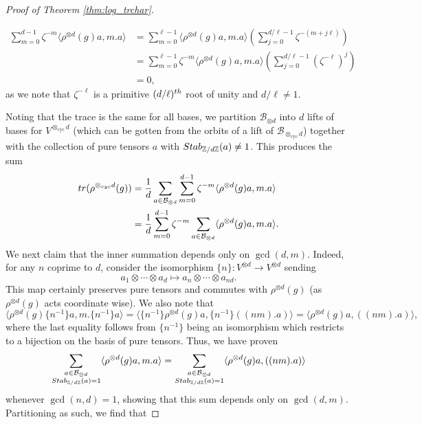 \documentclass[10pt,a4paper]{amsart}
\newcommand{\Stab}{\textnormal{Stab}}
\newcommand{\Z}{\mathbb{Z}}
\begin{document}
\begin{proof}[Proof of Theorem \ref{thm:log_trchar}]
\begin{enumerate}
{    \begin{align*}
    \sum_{m=0}^{d-1} \zeta^{-m}\langle \rho^{\otimes d}(g)a,m.a\rangle &= \sum_{m=0}^{\ell-1}\langle \rho^{\otimes d}(g)a,m.a\rangle \left(\sum_{j=0}^{d/\ell - 1} \zeta^{-(m+j\ell)}\right)\\
    &=\sum_{m=0}^{\ell-1}\zeta^{-m}\langle \rho^{\otimes d}(g)a,m.a\rangle \left(\sum_{j=0}^{d/\ell - 1} (\zeta^{-\ell})^j\right)\\
    &= 0,
    \end{align*}
    as we note that $\zeta^{-\ell}$ is a primitive $(d/\ell)^{\rm th}$ root of unity and $d/\ell\ne 1$.}
\end{enumerate}

Noting that the trace is the same for all bases, we partition $\mathcal{B}_{\otimes d}$ into $d$ lifts of bases for $V^{\otimes_{\text{cyc}} d}$ (which can be gotten from the orbits of a lift of $\mathcal{B}_{\otimes_{\text{cyc}}d}$) together with the collection of pure tensors $a$ with $\Stab_{\Z/d\Z}(a)\ne 1$. This produces the sum
\begin{align*}
{\rm tr}(\rho^{\otimes_{\rm cyc} d}(g))&=\frac{1}{d}\sum_{a\in\mathcal{B}_{\otimes d}}\sum_{m=0}^{d-1} \zeta^{-m} \langle\rho^{\otimes d}(g)a,m.a\rangle\\
&=\frac{1}{d}\sum_{m=0}^{d-1}\zeta^{-m} \sum_{a\in\mathcal{B}_{\otimes d}} \langle\rho^{\otimes d}(g)a,m.a\rangle.
\end{align*}
We next claim that the inner summation depends only on $\gcd(d,m)$. Indeed, for any $n$ coprime to $d$, consider the isomorphism $\{n\}:V^{\otimes d} \to V^{\otimes d}$ sending
\[
a_1\otimes \cdots \otimes a_d\mapsto a_n\otimes \cdots \otimes a_{nd}.
\]
This map certainly preserves pure tensors and commutes with $\rho^{\otimes d}(g)$ (as $\rho^{\otimes d}(g)$ acts coordinate wise). We also note that
\[
\langle \rho^{\otimes d}(g)\{n^{-1}\}a,m.\{n^{-1}\}a\rangle = \langle\{n^{-1}\} \rho^{\otimes d}(g)a,\{n^{-1}\}((nm).a)\rangle = \langle\rho^{\otimes d}(g)a,((nm).a)\rangle,
\]
where the last equality follows from $\{n^{-1}\}$ being an isomorphism which restricts to a bijection on the basis of pure tensors. Thus, we have proven
\[
\sum_{\substack{a\in\mathcal{B}_{\otimes d}\\\Stab_{\Z/d\Z}(a)=1}} \langle\rho^{\otimes d}(g)a,m.a\rangle = \sum_{\substack{a\in\mathcal{B}_{\otimes d}\\\Stab_{\Z/d\Z}(a)=1}} \langle\rho^{\otimes d}(g)a,((nm).a)\rangle
\]
whenever $\gcd(n,d)=1$, showing that this sum depends only on $\gcd(d,m)$. Partitioning as such, we find that

\end{proof}
\end{document}
